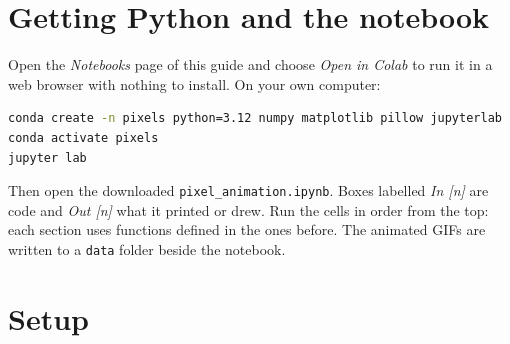 \section{Getting Python and the notebook}
Open the \emph{Notebooks} page of this guide and choose \emph{Open in Colab} to run it in a web browser with nothing to install. On your own computer:
\begin{lstlisting}[language=bash]
conda create -n pixels python=3.12 numpy matplotlib pillow jupyterlab
conda activate pixels
jupyter lab
\end{lstlisting}
Then open the downloaded \texttt{pixel\_animation.ipynb}. Boxes labelled \emph{In [n]} are code and \emph{Out [n]} what it printed or drew. Run the cells in order from the top: each section uses functions defined in the ones before. The animated GIFs are written to a \texttt{data} folder beside the notebook.

\section{Setup}

